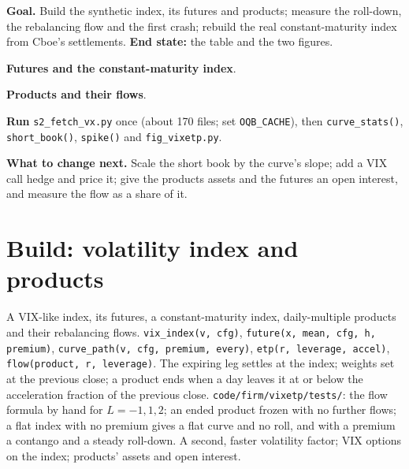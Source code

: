 \begin{tutorial}
\textbf{Goal.} Build the synthetic index, its futures and products; measure the roll-down, the rebalancing flow and the first crash; rebuild the real
constant-maturity index from Cboe's settlements. \textbf{End state:} the table and the two figures.
\begin{tutsteps}
\item \textbf{Futures and the constant-maturity index}.
\label{lst:s2:the-volatility-index-complex:curve}
\item \textbf{Products and their flows}.
\label{lst:s2:the-volatility-index-complex:etp}
\item \textbf{Run} \texttt{s2\_fetch\_vx.py} once (about 170 files; set \texttt{OQB\_CACHE}), then \texttt{curve\_stats()}, \texttt{short\_book()},
\texttt{spike()} and \texttt{fig\_vixetp.py}.
\end{tutsteps}
\textbf{What to change next.} Scale the short book by the curve's slope; add a VIX call hedge and price it; give the products assets and the futures
an open interest, and measure the flow as a share of it.
\end{tutorial}

\section{Build: volatility index and products}\label{bld:s2:the-volatility-index-complex:vixetp}

\begin{build}
 A VIX-like index, its futures, a constant-maturity index, daily-multiple products and their rebalancing flows.
 \texttt{vix\_index(v, cfg)}, \texttt{future(x, mean, cfg, h, premium)}, \texttt{curve\_path(v, cfg, premium, every)},
\texttt{etp(r, leverage, accel)}, \texttt{flow(product, r, leverage)}.
 The expiring leg settles at the index; weights set at the previous close; a product ends when a day leaves it at or below the
acceleration fraction of the previous close.
 \texttt{code/firm/vixetp/tests/}: the flow formula by hand for $L = -1, 1, 2$; an ended product frozen with no further
flows; a flat index with no premium gives a flat curve and no roll, and with a premium a contango and a steady roll-down.
 A second, faster volatility factor; VIX options on the index; products' assets and open interest.
\end{build}

